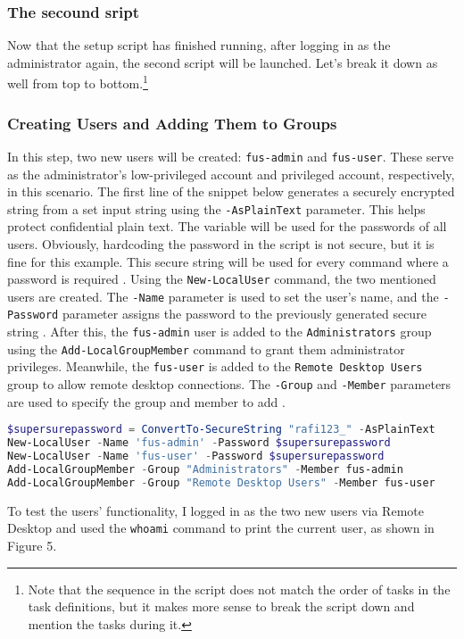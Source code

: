 \documentclass[a4paper]{article}
\newcommand{\abc}{\hfill \break}
\begin{document}
\subsubsection{The secound sript}
Now that the setup script has finished running, after logging in as the administrator again, the second script will be launched. Let's break it down as well from top to bottom.\footnote{Note that the sequence in the script does not match the order of tasks in the task definitions, but it makes more sense to break the script down and mention the tasks during it.} \abc
\subsubsection{Creating Users and Adding Them to Groups}
In this step, two new users will be created: \texttt{fus-admin} and \texttt{fus-user}. These serve as the administrator's low-privileged account and privileged account, respectively, in this scenario. \abc
The first line of the snippet below generates a securely encrypted string from a set input string using the \texttt{-AsPlainText} parameter. This helps protect confidential plain text. The variable will be used for the passwords of all users. Obviously, hardcoding the password in the script is not secure, but it is fine for this example. This secure string will be used for every command where a password is required \cite{ConvertTo-SecureString}.
Using the \texttt{New-LocalUser} command, the two mentioned users are created. The \texttt{-Name} parameter is used to set the user's name, and the \texttt{-Password} parameter assigns the password to the previously generated secure string \cite{New-LocalUser}. \abc
After this, the \texttt{fus-admin} user is added to the \texttt{Administrators} group using the \texttt{Add-LocalGroupMember} command to grant them administrator privileges. Meanwhile, the \texttt{fus-user} is added to the \texttt{Remote Desktop Users} group to allow remote desktop connections. The \texttt{-Group} and \texttt{-Member} parameters are used to specify the group and member to add \cite{Add-LocalGroupMember}. \abc
\begin{lstlisting}[language=PowerShell]
$supersurepassword = ConvertTo-SecureString "rafi123_" -AsPlainText
New-LocalUser -Name 'fus-admin' -Password $supersurepassword
New-LocalUser -Name 'fus-user' -Password $supersurepassword
Add-LocalGroupMember -Group "Administrators" -Member fus-admin
Add-LocalGroupMember -Group "Remote Desktop Users" -Member fus-user
\end{lstlisting}
To test the users' functionality, I logged in as the two new users via Remote Desktop and used the \texttt{whoami} command to print the current user, as shown in Figure 5.
\end{document}
